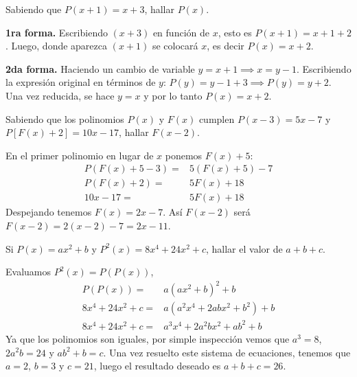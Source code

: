 \begin{example}
    Sabiendo que $P(x + 1) = x + 3$, hallar $P(x)$.
\end{example}
\begin{solution}
    \textbf{1ra forma.} Escribiendo $(x + 3)$ en función de $x$, esto es $P(x + 1) = x + 1 + 2$.
    Luego, donde aparezca $(x + 1)$ se colocará $x$, es decir $P(x) = x + 2$.

    \textbf{2da forma.} Haciendo un cambio de variable $y = x + 1 \implies x = y - 1$.
    Escribiendo la expresión original en términos de $y$: $P(y) = y - 1 + 3 \implies P(y) = y + 2$.
    Una vez reducida, se hace $y = x$ y por lo tanto $P(x) = x + 2$.
\end{solution}

\begin{example}
    Sabiendo que los polinomios $P(x)$ y $F(x)$ cumplen $P(x - 3) = 5x - 7$ y $P[F(x) + 2] = 10x - 17$, hallar $F(x - 2)$.
\end{example}
\begin{solution}
    En el primer polinomio en lugar de $x$ ponemos $F(x) + 5$:
    \begin{align*}
        P(F(x) + 5 - 3) =&  5 (F(x) + 5) - 7\\
        P(F(x) + 2) =& 5F(x) + 18\\
        10x - 17 =& 5F(x) + 18
    \end{align*}
    Despejando tenemos $F(x) = 2x - 7$.
    Así $F(x - 2)$ será $F(x - 2) = 2(x - 2) - 7 = \boxed{2x - 11}$.
\end{solution}

\begin{example}
    Si $P(x) = ax^2 + b$ y $P^2(x) = 8x^4 + 24x^2 + c$, hallar el valor de $a + b + c$.
\end{example}
\begin{solution}
    Evaluamos $P^2(x) = P(P(x))$,
    \begin{align*}
        P(P(x)) =& a (ax^2 + b)^2 + b\\
        8x^4 + 24x^2 + c =& a (a^2 x^4 + 2abx^2 + b^2) + b\\
        8x^4 + 24x^2 + c =& a^3 x^4 + 2a^2 bx^2 + ab^2 + b
    \end{align*}
    Ya que los polinomios son iguales, por simple inspección vemos que $a^3 = 8$, $2a^2 b = 24$ y $ab^2 + b = c$.
    Una vez resuelto este sistema de ecuaciones, tenemos que $a = 2$, $b = 3$ y $c = 21$, luego el resultado deseado es $a + b + c = 26$.
\end{solution}

